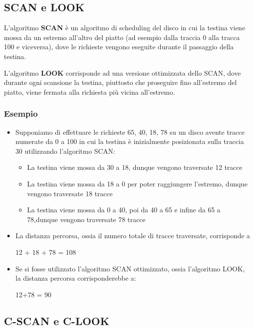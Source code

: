 \documentclass{article}
\begin{document}
\subsection{SCAN e LOOK}
L'algoritmo \textbf{SCAN} è un algoritmo di scheduling del disco in cui la testina viene mossa da un estremo all'altro del piatto (ad esempio dalla traccia 0 alla tracca 100 e viceversa), dove le richieste vengono eseguite durante il passaggio della testina.\par
L'algoritmo \textbf{LOOK} corrisponde ad una versione ottimizzata dello SCAN, dove durante ogni scansione la testina, piuttosto che proseguire fino all'estremo del piatto, viene fermata alla richiesta più vicina all'estremo.

\subsubsection{Esempio}
\begin{itemize}
    \item Supponiamo di effettuare le richieste 65, 40, 18, 78 su un disco avente tracce numerate da 0 a 100 in cui la testina è inizialmente posizionata sulla traccia 30 utilizzando l'algoritmo SCAN:
    \begin{itemize}
        \item La testina viene mossa da 30 a 18, dunque vengono traversate 12 tracce
        \item La testina viene mossa da 18 a 0 per poter raggiungere l'estremo, dunque
        vengono traversate 18 tracce
        \item La testina viene mossa da 0 a 40, poi da 40 a 65 e infine da 65 a 78,dunque vengono traversate 78 tracce
    \end{itemize}
    \item La distanza percorsa, ossia il numero totale di tracce traversate, corrisponde a
   \begin{center}
    12 + 18 + 78 = 108
   \end{center}
    \item Se si fosse utilizzato l'algoritmo SCAN ottimizzato, ossia l'algoritmo LOOK, la distanza percorsa corrisponderebbe a:
    \begin{center}
        12+78 = 90
    \end{center}
\end{itemize}


\subsection{C-SCAN e C-LOOK}
\end{document}
